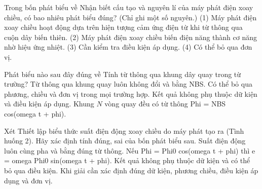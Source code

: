 \begin{ex}
Trong bốn phát biểu về Nhận biết cấu tạo và nguyên lí của máy phát điện xoay chiều, có bao nhiêu phát biểu đúng? (Chỉ ghi một số nguyên.) (1) Máy phát điện xoay chiều hoạt động dựa trên hiện tượng cảm ứng điện từ khi từ thông qua cuộn dây biến thiên. (2) Máy phát điện xoay chiều biến điện năng thành cơ năng nhờ hiệu ứng nhiệt. (3) Cần kiểm tra điều kiện áp dụng. (4) Có thể bỏ qua đơn vị.
\end{ex}

\begin{ex}
Phát biểu nào sau đây đúng về Tính từ thông qua khung dây quay trong từ trường?
\choice
{Từ thông qua khung quay luôn không đổi và bằng NBS.}
{Có thể bỏ qua phương, chiều và đơn vị trong mọi trường hợp.}
{Kết quả không phụ thuộc dữ kiện và điều kiện áp dụng.}
{\True Khung $N$ vòng quay đều có từ thông Phi = NBS cos(omega t + phi).}
\end{ex}

\begin{ex}
Xét Thiết lập biểu thức suất điện động xoay chiều do máy phát tạo ra (Tình huống 2). Hãy xác định tính đúng, sai của bốn phát biểu sau.
\choiceTF
{Suất điện động luôn cùng pha và bằng đúng từ thông.}
{\True Nếu Phi = Phi0 cos(omega t + phi) thì e = omega Phi0 sin(omega t + phi).}
{Kết quả không phụ thuộc dữ kiện và có thể bỏ qua điều kiện.}
{\True Khi giải cần xác định đúng dữ kiện, phương chiều, điều kiện áp dụng và đơn vị.}
\end{ex}


